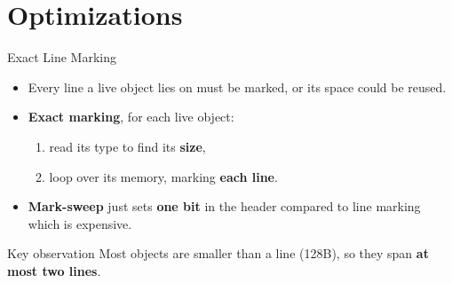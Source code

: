 \documentclass[aspectratio=169]{beamer}
\begin{document}
\section{Optimizations}

\begin{frame}{Exact Line Marking}
	\begin{itemize}
		\item Every line a live object lies on must be marked, or its space could be reused.
		\item \textbf{Exact marking}, for each live object:
		      \begin{enumerate}
			      \item read its type to find its \textbf{size},
			      \item loop over its memory, marking \textbf{each line}.
		      \end{enumerate}
		\item \textbf{Mark-sweep} just sets \textbf{one bit} in the header compared to line marking which is \alert{expensive}.
	\end{itemize}

	\begin{exampleblock}{Key observation}
		\vspace{0.1em}
		Most objects are smaller than a line (128B), so they span \textbf{at most two lines}.
	\end{exampleblock}
\end{frame}
\end{document}
